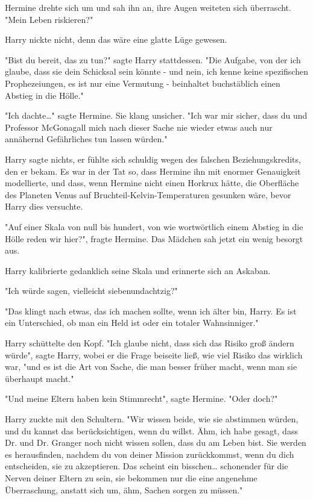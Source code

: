 {Hermine drehte sich um und sah ihn an, ihre Augen weiteten sich überrascht. "Mein Leben riskieren?"

Harry nickte nicht, denn das wäre eine glatte Lüge gewesen.

"Bist du bereit, das zu tun?" sagte Harry stattdessen. "Die Aufgabe, von der ich glaube, dass sie dein Schicksal sein könnte - und nein, ich kenne keine spezifischen Prophezeiungen, es ist nur eine Vermutung - beinhaltet buchstäblich einen Abstieg in die Hölle."

"Ich dachte…" sagte Hermine. Sie klang unsicher. "Ich war mir sicher, dass du und Professor McGonagall mich nach dieser Sache nie wieder etwas auch nur annähernd Gefährliches tun lassen würden."

Harry sagte nichts, er fühlte sich schuldig wegen des falschen Beziehungskredits, den er bekam. Es war in der Tat so, dass Hermine ihn mit enormer Genauigkeit modellierte, und dass, wenn Hermine nicht einen Horkrux hätte, die Oberfläche des Planeten Venus auf Bruchteil-Kelvin-Temperaturen gesunken wäre, bevor Harry dies versuchte.

"Auf einer Skala von null bis hundert, von wie wortwörtlich einem Abstieg in die Hölle reden wir hier?", fragte Hermine. Das Mädchen sah jetzt ein wenig besorgt aus.

Harry kalibrierte gedanklich seine Skala und erinnerte sich an Askaban.

"Ich würde sagen, vielleicht siebenundachtzig?"

"Das klingt nach etwas, das ich machen sollte, wenn ich älter bin, Harry. Es ist ein Unterschied, ob man ein Held ist oder ein totaler Wahnsinniger."

Harry schüttelte den Kopf. "Ich glaube nicht, dass sich das Risiko groß ändern würde", sagte Harry, wobei er die Frage beiseite ließ, wie viel Risiko das wirklich war, "und es ist die Art von Sache, die man besser früher macht, wenn man sie überhaupt macht."

"Und meine Eltern haben kein Stimmrecht", sagte Hermine. "Oder doch?"

Harry zuckte mit den Schultern. "Wir wissen beide, wie sie abstimmen würden, und du kannst das berücksichtigen, wenn du willst. Ähm, ich habe gesagt, dass Dr. und Dr. Granger noch nicht wissen sollen, dass du am Leben bist. Sie werden es herausfinden, nachdem du von deiner Mission zurückkommst, wenn du dich entscheiden, sie zu akzeptieren. Das scheint ein bisschen… schonender für die Nerven deiner Eltern zu sein, sie bekommen nur die eine angenehme Überraschung, anstatt sich um, ähm, Sachen sorgen zu müssen."

}
